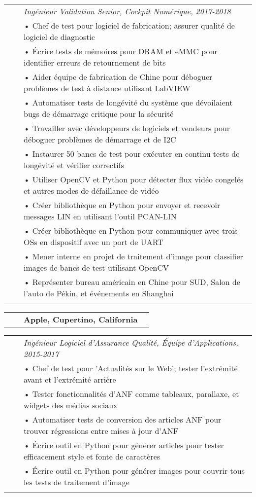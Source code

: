 \documentclass{minimal}
\begin{document}
\begin{tabular}{ p{1.5cm} p{1cm} p{16cm} }
& & \textit{Ingénieur Validation Senior, Cockpit Numérique, 2017-2018}\\
& & • Chef de test pour logiciel de fabrication; assurer qualité de logiciel de diagnostic\\
& & • Écrire tests de mémoires pour DRAM et eMMC pour identifier erreurs de retournement de bits\\
& & • Aider équipe de fabrication de Chine pour déboguer problèmes de test à distance utilisant LabVIEW\\
& & • Automatiser tests de longévité du système que dévoilaient bugs de démarrage critique pour la sécurité\\
& & • Travailler avec développeurs de logiciels et vendeurs pour déboguer problèmes de démarrage et de I2C\\
& & • Instaurer 50 bancs de test pour exécuter en continu tests de longévité et vérifier correctifs\\
& & • Utiliser OpenCV et Python pour détecter flux vidéo congelés et autres modes de défaillance de vidéo\\
& & • Créer bibliothèque en Python pour envoyer et recevoir messages LIN en utilisant l'outil PCAN-LIN\\
& & • Créer bibliothèque en Python pour communiquer avec trois OSs en dispositif avec un port de UART\\
& & • Mener interne en projet de traitement d'image pour classifier images de bancs de test utilisant OpenCV\\
& & • Représenter bureau américain en Chine pour SUD, Salon de l'auto de Pékin, et événements en Shanghai\\
& & \\
\end{tabular}

\begin{tabular}{ p{1.5cm} p{1cm} p{10cm} >{\raggedleft\arraybackslash}p{3cm} }
& & \textbf{Apple, Cupertino, California} & \\
\end{tabular}

\begin{tabular}{ p{1.5cm} p{1cm} p{16cm} }
& & \textit{Ingénieur Logiciel d'Assurance Qualité, Équipe d'Applications, 2015-2017}\\
& & • Chef de test pour 'Actualités sur le Web'; tester l'extrémité avant et l'extrémité arrière\\ 
& & • Tester fonctionnalités d'ANF comme tableaux, parallaxe, et widgets des médias sociaux\\
& & • Automatiser tests de conversion des articles ANF pour trouver régressions entre mises à jour d'ANF\\
& & • Écrire outil en Python pour générer articles pour tester efficacement style et fonte de caractères\\
& & • Écrire outil en Python pour générer images pour couvrir tous les tests de traitement d'image\\
& & \\
\end{tabular}
\end{document}
